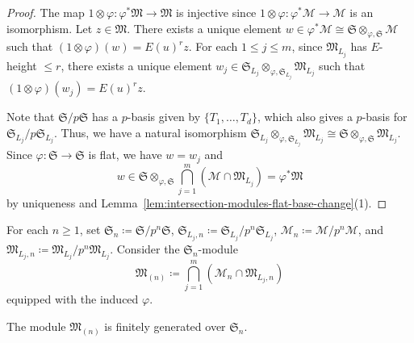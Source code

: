 \begin{proof}
The map $1\otimes\varphi\colon \varphi^*\mathfrak{M} \rightarrow \mathfrak{M}$ is injective since $1\otimes\varphi\colon \varphi^*\mathcal{M} \rightarrow \mathcal{M}$ is an isomorphism. Let $z \in \mathfrak{M}$. There exists a unique element $w \in \varphi^*\mathcal{M} \cong \mathfrak{S}\otimes_{\varphi, \mathfrak{S}}\mathcal{M}$ such that $(1\otimes\varphi)(w) = E(u)^r z$. For each $1 \leq j \leq m$, since $\mathfrak{M}_{L_j}$ has $E$-height $\leq r$, there exists a unique element $w_j \in \mathfrak{S}_{L_j}\otimes_{\varphi, \mathfrak{S}_{L_j}} \mathfrak{M}_{L_j}$ such that $(1\otimes\varphi)(w_j) = E(u)^r z$. 

Note that $\mathfrak{S}/p\mathfrak{S}$ has a $p$-basis given by $\{T_1, \ldots, T_d\}$, which also gives a $p$-basis for $\mathfrak{S}_{L_j}/p\mathfrak{S}_{L_j}$. Thus, we have a natural isomorphism $\mathfrak{S}_{L_j}\otimes_{\varphi, \mathfrak{S}_{L_j}} \mathfrak{M}_{L_j} \cong \mathfrak{S}\otimes_{\varphi, \mathfrak{S}} \mathfrak{M}_{L_j}$. Since $\varphi\colon \mathfrak{S} \rightarrow \mathfrak{S}$ is flat, we have $w = w_j$ and
\[
w \in \mathfrak{S}\otimes_{\varphi, \mathfrak{S}} \bigcap_{j=1}^m (\mathcal{M}\cap \mathfrak{M}_{L_j}) = \varphi^*\mathfrak{M}
\]
by uniqueness and Lemma~\ref{lem:intersection-modules-flat-base-change}(1).
\end{proof}

For each $n \geq 1$, set $\mathfrak{S}_{n} \coloneqq \mathfrak{S}/p^n \mathfrak{S}$, $\mathfrak{S}_{L_j, n} \coloneqq \mathfrak{S}_{L_j}/p^n \mathfrak{S}_{L_j}$, $\mathcal{M}_n \coloneqq \mathcal{M}/p^n \mathcal{M}$, and $\mathfrak{M}_{L_j, n} \coloneqq \mathfrak{M}_{L_j}/p^n \mathfrak{M}_{L_j}$. Consider the $\mathfrak{S}_n$-module
\[
\mathfrak{M}_{(n)} \coloneqq \bigcap_{j=1}^m (\mathcal{M}_n \cap \mathfrak{M}_{L_j, n})
\]
equipped with the induced $\varphi$.

\begin{lem} \label{lem:torsion-finitely-generated}
The module $\mathfrak{M}_{(n)}$ is finitely generated over $\mathfrak{S}_{n}$.
\end{lem}

